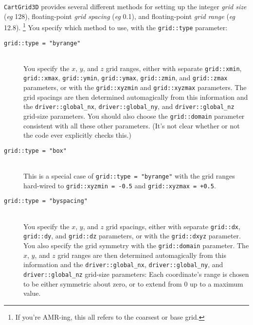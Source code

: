 \documentclass{article}
\begin{document}
\verb|CartGrid3D| provides several different methods for setting
up the integer {\em grid size\/} ({\it eg} 128), floating-point
{\em grid spacing\/} ({\it eg} 0.1), and floating-point {\em grid range\/}
({\it eg} 12.8).%
\footnote{%
	 If you're AMR-ing, this all refers to the
	 coarsest or base grid.%
	 }%
{}  You specify which method to use, with the \verb|grid::type| parameter:
\begin{description}
\item[{\tt grid::type = "byrange"}]\mbox{}\\
	You specify the $x$, $y$, and $z$ grid ranges, either with
	separate \verb|grid::xmin|, \verb|grid::xmax|, \verb|grid::ymin|,
	\verb|grid::ymax|, \verb|grid::zmin|, and \verb|grid::zmax|
	parameters, or with the \verb|grid::xyzmin| and
	\verb|grid::xyzmax| parameters.  The grid spacings are then
	determined automagically from this information and the
	\verb|driver::global_nx|, \verb|driver::global_ny|, and
	\verb|driver::global_nz| grid-size parameters.  You should
	also choose the \verb|grid::domain| parameter consistent with
	all these other parameters.  (It's not clear whether or not
	the code ever explicitly checks this.)
\item[{\tt grid::type = "box"}]\mbox{}\\
	This is a special case of \verb|grid::type = "byrange"|
	with the grid ranges hard-wired to
	\verb|grid::xyzmin = -0.5| and \verb|grid::xyzmax = +0.5|.
\item[{\tt grid::type = "byspacing"}]\mbox{}\\
	You specify the $x$, $y$, and $z$ grid spacings, either with
	separate \verb|grid::dx|, \verb|grid::dy|, and \verb|grid::dz|
	parameters, or with the \verb|grid::dxyz| parameter.  You also
	specify the grid symmetry with the \verb|grid::domain| parameter.
	The $x$, $y$, and $z$ grid ranges are then determined automagically
	from this information and the \verb|driver::global_nx|,
	\verb|driver::global_ny|, and \verb|driver::global_nz|
	grid-size parameters:  Each coordinate's range is chosen
	to be either symmetric about zero, or to extend from 0 up
	to a maximum value.
\end{description}
\end{document}
